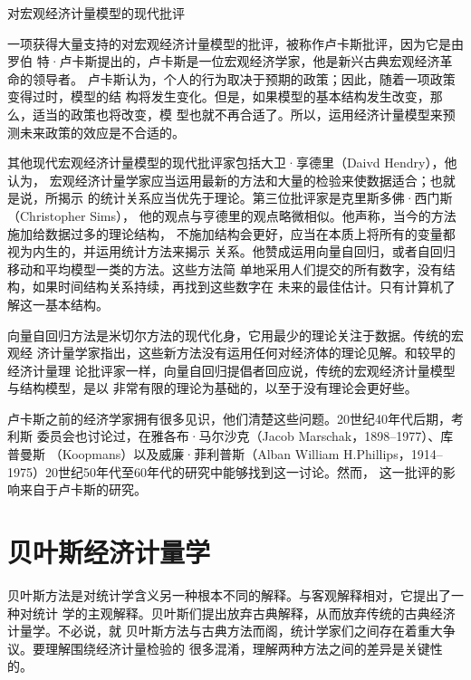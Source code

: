 \begin{mybox}{对宏观经济计量模型的现代批评}
  \begin{multicols}{2}

    一项获得大量支持的对宏观经济计量模型的批评，被称作卢卡斯批评，因为它是由罗伯
    特·卢卡斯提出的，卢卡斯是一位宏观经济学家，他是新兴古典宏观经济革命的领导者。
    卢卡斯认为，个人的行为取决于预期的政策；因此，随着一项政策变得过时，模型的结
    构将发生变化。但是，如果模型的基本结构发生改变，那么，适当的政策也将改变，模
    型也就不再合适了。所以，运用经济计量模型来预测未来政策的效应是不合适的。

    其他现代宏观经济计量模型的现代批评家包括大卫·享德里（Daivd Hendry），他认为，
    宏观经济计量学家应当运用最新的方法和大量的检验来使数据适合；也就是说，所揭示
    的统计关系应当优先于理论。第三位批评家是克里斯多佛·西门斯（Christopher Sims），
    他的观点与亨德里的观点略微相似。他声称，当今的方法施加给数据过多的理论结构，
    不施加结构会更好，应当在本质上将所有的变量都视为内生的，并运用统计方法来揭示
    关系。他赞成运用向量自回归，或者自回归移动和平均模型一类的方法。这些方法简
    单地采用人们提交的所有数字，没有结构，如果时间结构关系持续，再找到这些数字在
    未来的最佳估计。只有计算机了解这一基本结构。

    向量自回归方法是米切尔方法的现代化身，它用最少的理论关注于数据。传统的宏观经
    济计量学家指出，这些新方法没有运用任何对经济体的理论见解。和较早的经济计量理
    论批评家一样，向量自回归提倡者回应说，传统的宏观经济计量模型与结构模型，是以
    非常有限的理论为基础的，以至于没有理论会更好些。


    卢卡斯之前的经济学家拥有很多见识，他们清楚这些问题。20世纪40年代后期，考利斯
    委员会也讨论过，在雅各布·马尔沙克（Jacob Marschak，1898--1977）、库普曼斯
    （Koopmans）以及威廉·菲利普斯（Alban William
    H.Phillips，1914--1975）20世纪50年代至60年代的研究中能够找到这一讨论。然而，
    这一批评的影响来自于卢卡斯的研究。
  \end{multicols}
\end{mybox}

\section{贝叶斯经济计量学}

贝叶斯方法是对统计学含义另一种根本不同的解释。与客观解释相对，它提出了一种对统计
学的主观解释。贝叶斯们提出放弃古典解释，从而放弃传统的古典经济计量学。不必说，就
贝叶斯方法与古典方法而阁，统计学家们之间存在着重大争议。要理解围绕经济计量检验的
很多混淆，理解两种方法之间的差异是关键性的。

